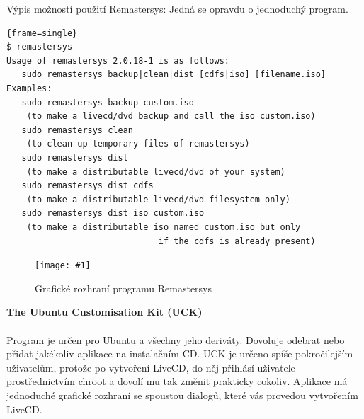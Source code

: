 \documentclass[a4paper,12pt]{article}
\newcommand{\nadpis}[1]{%
	\vspace{4 mm}
	\textbf{#1}\\
	\vspace{4 mm}
	}
\newcommand{\obr}[3]{%
	\begin{figure}[h]
	\center\texttt{[image: \#1]}
	\caption{#3}
	\end{figure}
	}
\newenvironment{codeframe}{%
  \begin{Sbox} 
    \begin{minipage} 
      {\columnwidth-\leftmargin-\rightmargin-2\fboxsep-2\fboxrule-4pt} 
}{%

  \end{minipage} 
  \end{Sbox} 
  \begin{center} 
    \fcolorbox{black}{codeback}{\TheSbox} 
  \end{center} 
}
\begin{document}
Výpis možností použití Remastersys: Jedná se opravdu o jednoduchý program.
    \begin{codeframe} 
\begin{Verbatim}{frame=single} 
$ remastersys
Usage of remastersys 2.0.18-1 is as follows:
   sudo remastersys backup|clean|dist [cdfs|iso] [filename.iso]
Examples:
   sudo remastersys backup custom.iso
    (to make a livecd/dvd backup and call the iso custom.iso)
   sudo remastersys clean
    (to clean up temporary files of remastersys)
   sudo remastersys dist
    (to make a distributable livecd/dvd of your system)
   sudo remastersys dist cdfs
    (to make a distributable livecd/dvd filesystem only)
   sudo remastersys dist iso custom.iso
    (to make a distributable iso named custom.iso but only
                              if the cdfs is already present)
\end{Verbatim} 
    \end{codeframe} 
\begin{center}
\obr{./img/screens/remastersys.png}{0.5}{Grafické rozhraní programu Remastersys}
\end{center}
\nadpis{The Ubuntu Customisation Kit (UCK)}\\
Program je určen pro Ubuntu a všechny jeho deriváty. Dovoluje odebrat nebo přidat jakékoliv aplikace na instalačním CD. UCK je určeno spíše pokročilejším uživatelům, protože po vytvoření LiveCD, do něj přihlásí uživatele prostřednictvím chroot a dovolí mu tak změnit prakticky cokoliv. Aplikace má jednoduché grafické rozhraní se spoustou dialogů, které vás provedou vytvořením LiveCD.\cite{Linux_Build}
\end{document}
